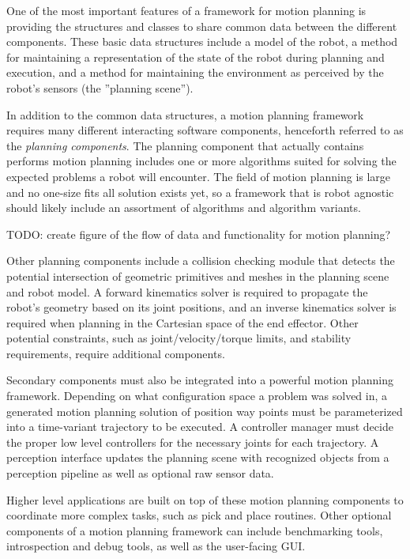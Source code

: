 \documentclass[10pt,journal,compsoc]{joser1}
\begin{document}
{One of the most important features of a framework for motion planning is providing the structures and classes to share common data between the different components. These basic data structures include a model of the robot, a method for maintaining a representation of the state of the robot during planning and execution, and a method for maintaining the environment as perceived by the robot's sensors (the ''planning scene'').

In addition to the common data structures, a motion planning framework requires many different interacting software components, henceforth referred to as the \textit{planning components}. The planning component that actually contains performs motion planning includes one or more algorithms suited for solving the expected problems a robot will encounter. The field of motion planning is large and no one-size fits all solution exists yet, so a framework that is robot agnostic should likely include an assortment of algorithms and algorithm variants.

TODO: create figure of the flow of data and functionality for motion planning? 

Other planning components include a collision checking module that detects the potential intersection of geometric primitives and meshes in the planning scene and robot model. A forward kinematics solver is required to propagate the robot's geometry based on its joint positions, and an inverse kinematics solver is required when planning in the Cartesian space of the end effector. Other potential constraints, such as joint/velocity/torque limits, and stability requirements, require additional components.

Secondary components must also be integrated into a powerful motion planning framework. Depending on what configuration space a problem was solved in, a generated motion planning solution of position way points must be parameterized into a time-variant trajectory to be executed. A controller manager must decide the proper low level controllers for the necessary joints for each trajectory. A perception interface updates the planning scene with recognized objects from a perception pipeline as well as optional raw sensor data.

Higher level applications are built on top of these motion planning components to coordinate more complex tasks, such as pick and place routines. Other optional components of a motion planning framework can include benchmarking tools, introspection and debug tools, as well as the user-facing GUI.

}
\end{document}
